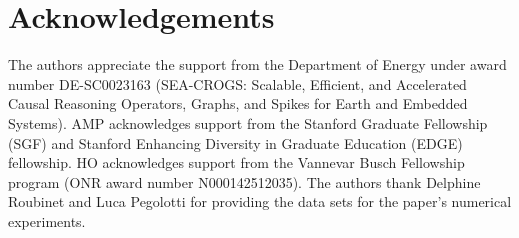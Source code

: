 \documentclass{article}
\theoremstyle{definition}
\theoremstyle{remark}
\begin{document}
\section{Acknowledgements}
The authors appreciate the support from the Department of Energy under award number DE-SC0023163 (SEA-CROGS: Scalable, Efficient, and Accelerated Causal Reasoning Operators, Graphs, and Spikes for Earth and Embedded Systems). AMP acknowledges support from the Stanford Graduate Fellowship (SGF) and Stanford Enhancing Diversity in Graduate Education (EDGE) fellowship. HO acknowledges support from the Vannevar Busch Fellowship program (ONR award number N000142512035). The authors thank Delphine Roubinet and Luca Pegolotti for providing the data sets for the paper's numerical experiments. 





\newpage
\appendix
\end{document}
